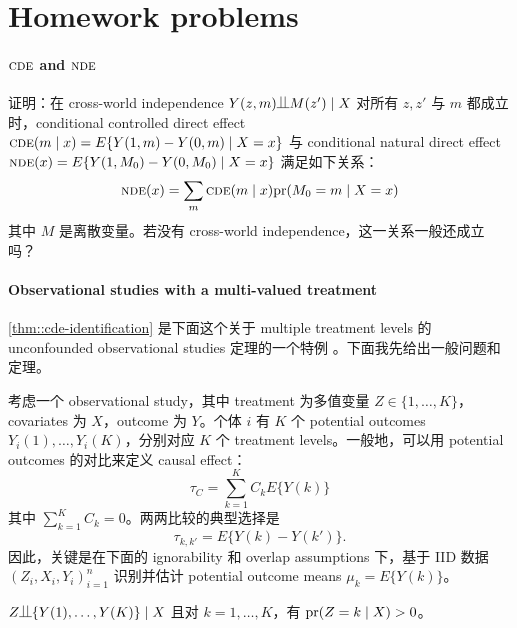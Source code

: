   
  \section{Homework problems}

\paragraph{$\textsc{cde}$ and $\textsc{nde}$}\label{problem::cde-nde}

证明：在 cross-world independence
$
Y(z,m) \ind M(z') \mid X
$
对所有 $z,z'$ 与 $m$ 都成立时，conditional controlled direct effect $\textsc{cde}(m\mid x) = E\{  Y(1,m)  - Y(0,m)\mid X=x\}$ 与 conditional natural direct effect $\textsc{nde}(x) = E\{   Y(1,M_0) - Y(0, M_0) \mid X=x  \}$ 满足如下关系：
$$
\textsc{nde}(x) = \sum_m \textsc{cde}(m\mid x) \textup{pr}(M_0 = m\mid X=x)
$$
其中 $M$ 是离散变量。若没有 cross-world independence，这一关系一般还成立吗？
  
  
  
  \paragraph{Observational studies with a multi-valued treatment}\label{para::obs-multi-valued-Z}
  
\cref{thm::cde-identification} 是下面这个关于 multiple treatment levels 的 unconfounded observational studies 定理的一个特例 \citep{imai2004causal, cattaneo2010efficient}。下面我先给出一般问题和定理。



考虑一个 observational study，其中 treatment 为多值变量 $Z \in \{ 1, \ldots, K \}$，covariates 为 $X$，outcome 为 $Y$。个体 $i$ 有 $K$ 个 potential outcomes $Y_i(1), \ldots, Y_i(K)$，分别对应 $K$ 个 treatment levels。一般地，可以用 potential outcomes 的对比来定义 causal effect：
$$
\tau_C  = \sum_{k=1}^K C_k   E\{  Y(k) \}
$$
其中 $  \sum_{k=1}^K C_k  = 0$。两两比较的典型选择是
$$
\tau_{k,k'} = E\{   Y(k) - Y(k') \}.
$$
因此，关键是在下面的 ignorability 和 overlap assumptions 下，基于 IID 数据 $(Z_i,  X_i, Y_i)_{i=1}^n$ 识别并估计 potential outcome means $\mu_k  =  E\{  Y(k) \}$。



\begin{assumption}
\label{assume::ignorability-multi-valued-Z}
$Z\ind \{ Y (1), \ldots, Y (K) \} \mid X$ 且对 $k=1,\ldots, K$，有 $\textup{pr}(Z = k \mid X) > 0$。
\end{assumption}



